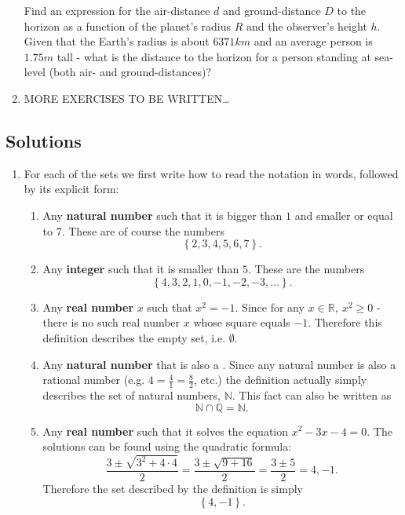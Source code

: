 \begin{enumerate}
		Find an expression for the air-distance $d$ and ground-distance $D$ to the horizon as a function of the planet's radius $R$ and the observer's height $h$. Given that the Earth's radius is about $6371\si{km}$ and an average person is $1.75\si{m}$ tall - what is the distance to the horizon for a person standing at sea-level (both air- and ground-distances)?

	\item MORE EXERCISES TO BE WRITTEN\ldots
\end{enumerate}

\subsection{Solutions}
\begin{enumerate}
	\item For each of the sets we first write how to read the notation in words, followed by its explicit form:
		\begin{enumerate}[label={(\roman*)}]
			\item Any \textbf{natural number} such that it is bigger than $1$ and smaller or equal to $7$. These are of course the numbers
				\[
					\left\{2,3,4,5,6,7\right\}.
				\]

			\item Any \textbf{integer} such that it is smaller than $5$. These are the numbers
				\[
					\left\{4,3,2,1,0,-1,-2,-3,\dots\right\}.
				\]

			\item Any \textbf{real number} $x$ such that $x^{2}=-1$. Since for any $x\in\mathbb{R},\ x^{2}\geq0$ - there is no such real number $x$ whose square equals $-1$. Therefore this definition describes the empty set, i.e. $\emptyset$.

			\item Any \textbf{natural number} that is also a . Since any natural number is also a rational number (e.g. $4=\frac{4}{1}=\frac{8}{2}$, etc.) the definition actually simply describes the set of natural numbers, $\mathbb{N}$. This fact can also be written as
				\[
					\mathbb{N} \cap \mathbb{Q} = \mathbb{N}.
				\]

			\item Any \textbf{real number} such that it solves the equation $x^{2}-3x-4=0$. The solutions can be found using the quadratic formula:
				\[
					\frac{3\pm\sqrt{3^{2}+4\cdot4}}{2} = \frac{3\pm\sqrt{9+16}}{2} = \frac{3\pm5}{2} = 4,-1.
				\]
				Therefore the set described by the definition is simply
				\[
					\left\{4,-1\right\}.
				\]


\end{enumerate}
\end{enumerate}
